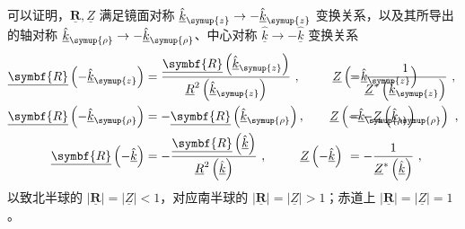 可以证明，$\underline{\symbf{R}}, \underline{Z}$ 满足镜面对称 $\hat{\underline{k}}_{\symup{z}} \rightarrow -\hat{\underline{k}}_{\symup{z}}$ 变换关系，以及其所导出的轴对称 $\hat{\underline{k}}_{\symup{\rho}} \rightarrow -\hat{\underline{k}}_{\symup{\rho}}$、中心对称 $\hat{\underline{k}} \rightarrow -\hat{\underline{k}}$ 变换关系
\begin{subequations} \label{eq:2-57}
\abovedisplayskip=10pt
\belowdisplayskip=10pt
\begin{align}
	\underline{\symbf{R}} \left( -\hat{\underline{k}}_{\symup{z}} \right) &= \frac{ \underline{\symbf{R}} \left( \hat{\underline{k}}_{\symup{z}} \right)}{ \underline{R}^2 \left( \hat{\underline{k}}_{\symup{z}} \right) } ~,\hspace{2.6em} \underline{Z} \left( -\hat{\underline{k}}_{\symup{z}} \right) \hspace{-6.8em}&&= \frac{ 1 }{ \underline{Z}^* \left( \hat{\underline{k}}_{\symup{z}} \right) } \label{eq:2-57a} ~,\\
	\underline{\symbf{R}} \left( -\hat{\underline{k}}_{\symup{\rho}} \right) &= -\underline{\symbf{R}} \left( \hat{\underline{k}}_{\symup{\rho}} \right),\hspace{2em} \underline{Z} \left( -\hat{\underline{k}}_{\symup{\rho}} \right) \hspace{-6.8em}&&= -\underline{Z} \left( \hat{\underline{k}}_{\symup{\rho}} \right) \label{eq:2-57b} ~,\\ \underline{\symbf{R}} \left( -\hat{\underline{k}} \right) &= -\frac{ \underline{\symbf{R}} \left( \hat{\underline{k}} \right)}{ \underline{R}^2 \left( \hat{\underline{k}} \right) } ~,\hspace{2.7em} \underline{Z} \left( -\hat{\underline{k}} \right) \hspace{-6.8em}&&= -\frac{ 1 }{ \underline{Z}^* \left( \hat{\underline{k}} \right) } \label{eq:2-57c} ~,
\end{align}
\end{subequations}
以致北半球的 $\left| \underline{\symbf{R}} \right| = \left| \underline{Z} \right| < 1$，对应南半球的 $\left| \underline{\symbf{R}} \right| = \left| \underline{Z} \right| > 1$；赤道上 $\left| \underline{\symbf{R}} \right| = \left| \underline{Z} \right| = 1$。

